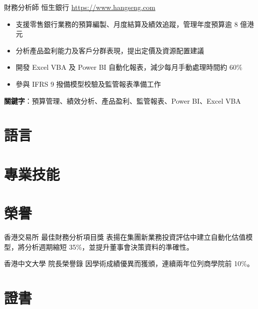 \documentclass[a4paper, serif, 10pt]{moderncv}
\begin{document}
        {財務分析師}
        {恒生銀行}
        {\url{https://www.hangseng.com}}
        {}
        {\begin{itemize}
\item 支援零售銀行業務的預算編製、月度結算及績效追蹤，管理年度預算逾 8 億港元
\item 分析產品盈利能力及客戶分群表現，提出定價及資源配置建議
\item 開發 Excel VBA 及 Power BI 自動化報表，減少每月手動處理時間約 60\%
\item 參與 IFRS 9 撥備模型校驗及監管報表準備工作
\end{itemize}
\textbf{關鍵字}：預算管理、績效分析、產品盈利、監管報表、Power BI、Excel VBA}
\section{語言}

\section{專業技能}

\section{榮譽}

        {香港交易所}
        {最佳財務分析項目獎}
        {}
        {}
        {表揚在集團新業務投資評估中建立自動化估值模型，將分析週期縮短 35\%，並提升董事會決策資料的準確性。}

        {香港中文大學}
        {院長榮譽錄}
        {}
        {}
        {因學術成績優異而獲頒，連續兩年位列商學院前 10\%。}
\section{證書}
\end{document}
